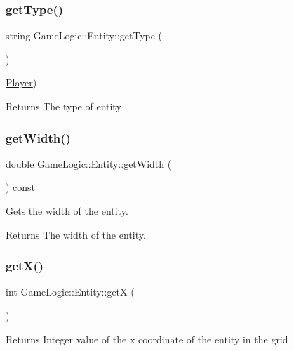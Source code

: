 \subsubsection{\texorpdfstring{get\+Type()}{getType()}}
{\footnotesize\ttfamily string Game\+Logic\+::\+Entity\+::get\+Type (\begin{DoxyParamCaption}{ }\end{DoxyParamCaption})}

\hyperlink{classGameLogic_1_1Player}{Player}) \begin{DoxyReturn}{Returns}
The type of entity 
\end{DoxyReturn}
\mbox{\label{classGameLogic_1_1Entity_a9a7be1c6095ef036eb91b962cd289dc3}} 
\subsubsection{\texorpdfstring{get\+Width()}{getWidth()}}
{\footnotesize\ttfamily double Game\+Logic\+::\+Entity\+::get\+Width (\begin{DoxyParamCaption}{ }\end{DoxyParamCaption}) const}

Gets the width of the entity. \begin{DoxyReturn}{Returns}
The width of the entity. 
\end{DoxyReturn}
\mbox{\label{classGameLogic_1_1Entity_a1d7c4fa1af58df883ae751c4e536c25d}} 
\subsubsection{\texorpdfstring{get\+X()}{getX()}}
{\footnotesize\ttfamily int Game\+Logic\+::\+Entity\+::getX (\begin{DoxyParamCaption}{ }\end{DoxyParamCaption})}

\begin{DoxyReturn}{Returns}
Integer value of the x coordinate of the entity in the grid 
\end{DoxyReturn}
\mbox{\label{classGameLogic_1_1Entity_a24a56a7da02136fd662b72b04fcf6c30}} 
